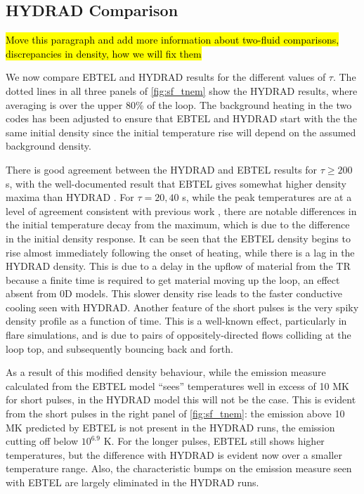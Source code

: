 \documentclass[]{aastex}
\begin{document}
		\subsection{HYDRAD Comparison}
		\label{subsec:hydrad_compare}
		\hl{Move this paragraph and add more information about two-fluid comparisons, discrepancies in density, how we will fix them}
		\par We now compare EBTEL and HYDRAD results for the different values of $\tau$. The dotted lines in all three panels of \autoref{fig:sf_tnem} show the HYDRAD results, where averaging is over the upper 80\% of the loop. The background heating in the two codes has been adjusted to ensure that EBTEL and HYDRAD start with the the same initial density since the initial temperature rise will depend on the assumed background density.
		\par There is good agreement between the HYDRAD and EBTEL results for $\tau\ge200$ s, with the well-documented result that EBTEL gives somewhat higher density maxima than HYDRAD \citep[see][]{cargill_enthalpy-based_2012}. For $\tau=20,40$ s, while the peak temperatures are at a level of agreement consistent with previous work \citep{cargill_enthalpy-based_2012}, there are notable differences in the initial temperature decay from the maximum, which is due to the difference in the initial density response. It can be seen that the EBTEL density begins to rise almost immediately following the onset of heating, while there is a lag in the HYDRAD density. This is due to a delay in the upflow of material from the TR because a finite time is required to get material moving up the loop, an effect absent from 0D models. This slower density rise leads to the faster conductive cooling seen with HYDRAD. Another feature of the short pulses is the very spiky density profile as a function of time. This is a well-known effect, particularly in flare simulations, and is due to pairs of oppositely-directed flows colliding at the loop top, and subsequently bouncing back and forth.  
	
	\par As a result of this modified density behaviour, while the emission measure calculated from the EBTEL model ``sees'' temperatures well in excess of 10 MK for short pulses, in the HYDRAD model this will not be the case. This is evident from the short pulses in the right panel of \autoref{fig:sf_tnem}: the emission above 10 MK predicted by EBTEL is not present in the HYDRAD runs, the emission cutting off below $10^{6.9}$ K. For the longer pulses, EBTEL still shows higher temperatures, but the difference with HYDRAD is evident now over a smaller temperature range. Also, the characteristic bumps on the emission measure seen with EBTEL are largely eliminated in the HYDRAD runs.
\end{document}
